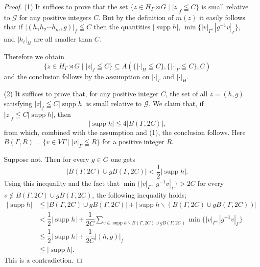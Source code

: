 \documentclass[10pt,a4paper]{amsart}
\renewcommand{\subset}{\subseteq}
\begin{document}
\begin{proof}
(1) It suffices to prove that the set $\{ z\in H_{\Gamma}\rtimes G \mid |z|_f\leqq C\}$
is small relative to $\mathcal{G}$ for any positive integers $C$. 
But by the definition of $m(z)$ it easily follows that if $|(h_1h_2\cdots h_m, g)|_f\leqq C$ then the quantities $|\mathop{supp}h|$, $\min\{ |v|_{\Gamma}, |g^{-1}v|_{\Gamma}\}$, and $|h_i|_H$ are all smaller than $C$. 

Therefore we obtain
\[
\{ z\in H_{\Gamma}\rtimes G \mid |z|_f\leqq C\} \subset
A(\{ |\cdot |_H\leqq C\}, \{ |\cdot |_{\Gamma}\leqq C\}, C )
\]
and the conclusion follows by the assumption on $|\cdot|_{\Gamma}$ and $|\cdot|_H$. 

(2) It suffices to prove that, for any positive integer $C$, the set of all $z=(h,g)$ satisfying $|z|_f\leqq C |\mathop{supp} h|$ is small relative to $\mathcal{G}$. 
We claim that, if $|z|_f\leqq C |\mathop{supp} h|$, then
\[
|\mathop{supp} h| \leqq 4 |B(\Gamma,2C)|,
\] 
from which, combined with the assumption and (1), the conclusion follows. 
Here $B(\Gamma,R)=\{v\in V\Gamma \mid |v|_{\Gamma} \leqq R\}$ for a positive integer $R$. 

Suppose not. Then for every $g\in G$ one gets
\[
|B(\Gamma, 2C)\cup gB(\Gamma,2C)|< \dfrac{1}{2}|\mathop{supp}h|. 
\]
Using this inequality and the fact that $\min\{ |v|_{\Gamma}, |g^{-1}v|_{\Gamma}\}>2C$ for every $v\notin B(\Gamma, 2C)\cup gB(\Gamma,2C)$, the following inequality holds;
\begin{align}
|\mathop{supp}h| 
&\leqq |B(\Gamma, 2C)\cup gB(\Gamma,2C) | + |\mathop{supp}h \backslash (B(\Gamma, 2C)\cup gB(\Gamma,2C))| \\
&< \dfrac{1}{2}|\mathop{supp}h| + \dfrac{1}{2C}\sum_{v\in \mathop{supp}h \backslash B(\Gamma, 2C)\cup gB(\Gamma,2C)} \min\{ |v|_{\Gamma}, |g^{-1}v|_{\Gamma}\}\\
&\leqq \dfrac{1}{2}|\mathop{supp}h| + \dfrac{1}{2C}|(h,g)|_f \\
&\leqq |\mathop{supp}h|. 
\end{align}
This is a contradiction. 



\end{proof}
\end{document}
